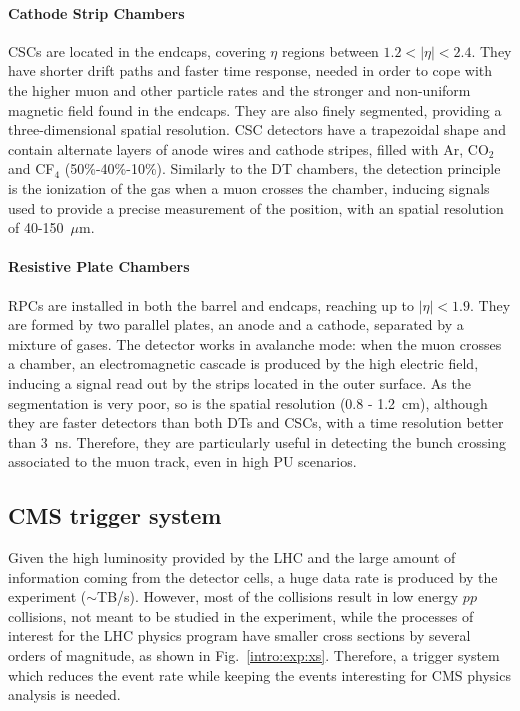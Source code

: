 \documentclass[../main.tex]{subfiles}
\begin{document}
\paragraph{Cathode Strip Chambers}
CSCs are located in the endcaps, covering $\eta$ regions between $1.2<|\eta|<2.4$. They have shorter drift paths and faster time response, needed in order to cope with the higher muon and other particle rates and the stronger and non-uniform magnetic field found in the endcaps. They are also finely segmented, providing a three-dimensional spatial resolution. CSC detectors have a trapezoidal shape and contain alternate layers of anode wires and cathode stripes, filled with Ar, CO${}_2$ and CF${}_4$ (50\%-40\%-10\%). Similarly to the DT chambers, the detection principle is the ionization of the gas when a muon crosses the chamber, inducing signals used to provide a precise measurement of the position, with an spatial resolution of 40-150~$\mu$m.

\paragraph{Resistive Plate Chambers}
RPCs are installed in both the barrel and endcaps, reaching up to $|\eta|<1.9$. They are formed by two parallel plates, an anode and a cathode, separated by a mixture of gases. The detector works in avalanche mode: when the muon crosses a chamber, an electromagnetic cascade is produced by the high electric field, inducing a signal read out by the strips located in the outer surface. As the segmentation is very poor, so is the spatial resolution (0.8 - 1.2~cm), although they are faster detectors than both DTs and CSCs, with a time resolution better than 3~ns. Therefore, they are particularly useful in detecting the bunch crossing associated to the muon track, even in high PU scenarios.




\subsection{CMS trigger system}

Given the high luminosity provided by the LHC and the large amount of information coming from the detector cells, a huge data rate is produced by the experiment ($\sim$TB/s). However, most of the collisions result in low energy $pp$ collisions, not meant to be studied in the experiment, while the processes of interest for the LHC physics program have smaller cross sections by several orders of magnitude, as shown in Fig.~\ref{intro:exp:xs}. Therefore, a trigger system which reduces the event rate while keeping the events interesting for CMS physics analysis is needed. 
\end{document}
